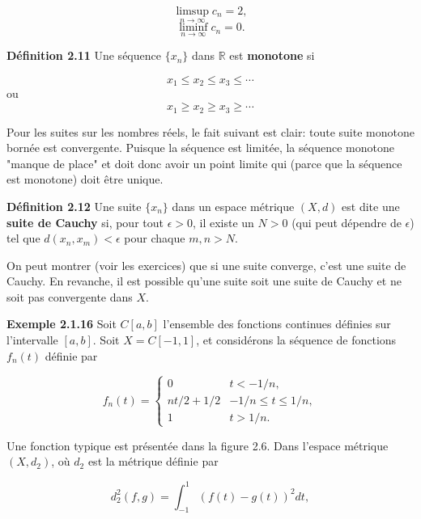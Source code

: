 \documentclass[11pt,twoside,a4paper]{article}
\begin{document}
\begin{equation*}
  \limsup_{n \longrightarrow \infty} c_n = 2,
\end{equation*}
\begin{equation*}
  \liminf_{n \longrightarrow \infty} c_n = 0.
\end{equation*}

\textbf{Définition 2.11} Une séquence $\{x_n\}$ dans $\mathbb{R}$ est \textbf{monotone} si

\begin{equation*}
  x_1 \leq x_2 \leq x_3 \leq \cdots
\end{equation*}
ou
\begin{equation*}
  x_1 \geq x_2 \geq x_3 \geq \cdots
\end{equation*}

Pour les suites sur les nombres réels, le fait suivant est clair: toute suite monotone bornée est convergente. Puisque la séquence est limitée, la séquence monotone "manque de place" et doit donc avoir un point limite qui (parce que la séquence est monotone) doit être unique.

\textbf{Définition 2.12} Une suite $\{x_n\}$ dans un espace métrique $(X, d)$ est dite une \textbf{suite de Cauchy} si, pour tout $\epsilon > 0$, il existe un $N > 0$ (qui peut dépendre de $\epsilon$) tel que $d(x_n, x_m) < \epsilon$ pour chaque $m, n > N$.

On peut montrer (voir les exercices) que si une suite converge, c'est une suite de Cauchy. En revanche, il est possible qu'une suite soit une suite de Cauchy et ne soit pas convergente dans $X$.

\textbf{Exemple 2.1.16} Soit $C[a, b]$ l'ensemble des fonctions continues définies sur l'intervalle $[a, b]$. Soit $X = C[-1, 1]$, et considérons la séquence de fonctions $f_n(t)$ définie par

\begin{equation}
  f_n(t) = \begin{cases} 0 & t < -1/n, \\
    nt/2 + 1/2 & -1/n \leq t \leq 1/n, \\
    1 & t > 1/n.
        \end{cases}
\end{equation}

Une fonction typique est présentée dans la figure 2.6. Dans l'espace métrique $(X, d_2)$, où $d_2$ est la métrique définie par

\begin{equation*}
  d_2^2(f, g) = \int_{-1}^{1}(f(t) - g(t))^2 dt,
\end{equation*}
\end{document}
